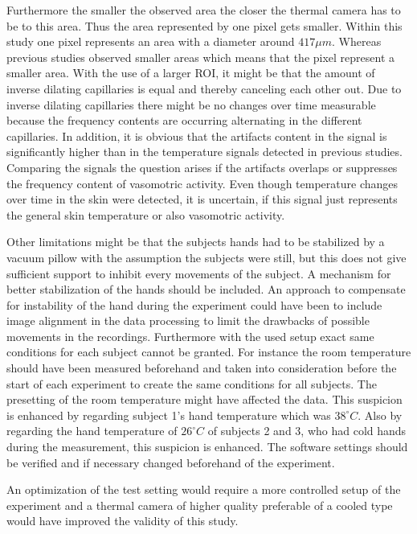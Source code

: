 Furthermore the smaller the observed area the closer the thermal camera has to be to this area. Thus the area represented by one pixel gets smaller. Within this study one pixel represents an area with a diameter around $417 \mu m$. Whereas previous studies observed smaller areas which means that the pixel represent a smaller area. With the use of a larger ROI, it might be that the amount of inverse dilating capillaries is equal and thereby canceling each other out. Due to inverse dilating capillaries there might be no changes over time measurable because the frequency contents are occurring alternating in the different capillaries. In addition, it is obvious that the artifacts content in the signal is significantly higher than in the temperature signals detected in previous studies. Comparing the signals the question arises if the artifacts overlaps or suppresses the frequency content of vasomotric activity. Even though temperature changes over time in the skin were detected, it is uncertain, if this signal just represents the general skin temperature or also vasomotric activity. %

Other limitations might be that the subjects hands had to be stabilized by a vacuum pillow with the assumption the subjects were still, but this does not give sufficient support to inhibit every movements of the subject.  A mechanism for better stabilization of the hands should be included. An approach to compensate for instability of the hand during the experiment could have been to include image alignment in the data processing to limit the drawbacks of possible movements in the recordings. Furthermore with the used setup exact same conditions for each subject cannot be granted. For instance the room temperature should have been measured beforehand and taken into consideration before the start of each experiment to create the same conditions for all subjects. The presetting of the room temperature might have affected the data. This suspicion is enhanced by regarding subject 1's hand temperature which was $38^\circ C$. Also by regarding the hand temperature of $26^\circ C$ of subjects 2 and 3, who had cold hands during the measurement, this suspicion is enhanced. The software settings should be verified and if necessary changed beforehand of the experiment.

An optimization of the test setting would require a more controlled setup of the experiment and a thermal camera of higher quality preferable of a cooled type would have improved the validity of this study.